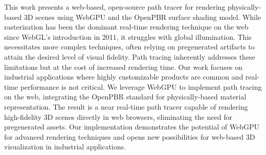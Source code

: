 
This work presents a web-based, open-source path tracer for rendering physically-based 3D scenes using WebGPU and the OpenPBR surface shading model. While rasterization has been the dominant real-time rendering technique on the web since WebGL's introduction in 2011, it struggles with global illumination. This necessitates more complex techniques, often relying on pregenerated artifacts to attain the desired level of visual fidelity. Path tracing inherently addresses these limitations but at the cost of increased rendering time. Our work focuses on industrial applications where highly customizable products are common and real-time performance is not critical. We leverage WebGPU to implement path tracing on the web, integrating the OpenPBR standard for physically-based material representation. The result is a near real-time path tracer capable of rendering high-fidelity 3D scenes directly in web browsers, eliminating the need for pregenerated assets. Our implementation demonstrates the potential of WebGPU for advanced rendering techniques and opens new possibilities for web-based 3D visualization in industrial applications.
